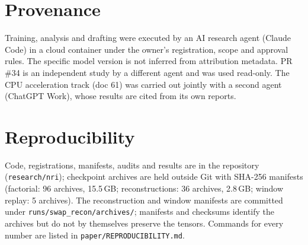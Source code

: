 \documentclass[11pt]{article}
\begin{document}
\section*{Provenance}
Training, analysis and drafting were executed by an AI research agent (Claude Code) in a cloud container under the
owner's registration, scope and approval rules. The specific model version is not inferred from attribution
metadata. PR \#34 is an independent study by a different agent and was used read-only. The CPU acceleration track
(doc 61) was carried out jointly with a second agent (ChatGPT Work), whose results are cited from its own reports.

\appendix
\section{Reproducibility}
Code, registrations, manifests, audits and results are in the repository (\texttt{research/nri}); checkpoint
archives are held outside Git with SHA-256 manifests (factorial: 96 archives, 15.5\,GB; reconstructions: 36 archives,
2.8\,GB; window replay: 5 archives). The reconstruction and window manifests are committed under
\texttt{runs/swap\_recon/archives/}; manifests and checksums identify the archives but do not by themselves preserve
the tensors. Commands for every number are listed in \texttt{paper/REPRODUCIBILITY.md}.



\end{document}
